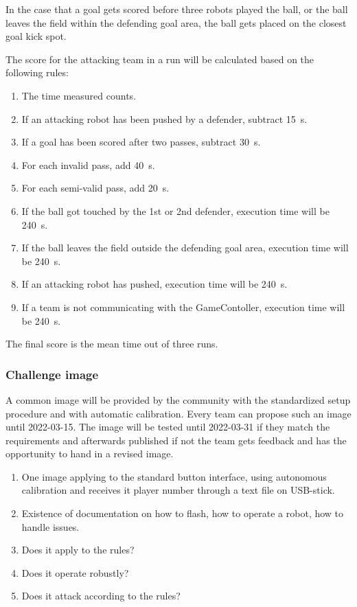         In the case that a goal gets scored before three robots played the ball, or the ball leaves the field within the defending goal area, the ball gets placed on the closest goal kick spot.

        The score for the attacking team in a run will be calculated based on the following rules:

        \begin{enumerate}
            \item The time measured counts.
            \item If an attacking robot has been pushed by a defender, subtract \qty{15}{\second}.
            \item If a goal has been scored after two passes, subtract \qty{30}{\second}.
            \item For each invalid pass, add \qty{40}{\second}.
            \item For each semi-valid pass, add \qty{20}{\second}.
            \item If the ball got touched by the 1st or 2nd defender, execution time will be \qty{240}{\second}.
            \item If the ball leaves the field outside the defending goal area, execution time will be \qty{240}{\second}.
            \item If an attacking robot has pushed, execution time will be \qty{240}{\second}.
            \item If a team is not communicating with the GameContoller, execution time will be \qty{240}{\second}.
        \end{enumerate}

        The final score is the mean time out of three runs.

    \subsubsection{Challenge image}
        \label{sec:Challenge_image}
        A common image will be provided by the community with the standardized setup procedure and with automatic calibration. Every team can propose such an image until 2022-03-15. The image will be tested until 2022-03-31 if they match the requirements and afterwards published if not the team gets feedback and has the opportunity to hand in a revised image.

        \begin{enumerate}
            \item One image applying to the standard button interface, using autonomous calibration and receives it player number through a text file on USB-stick.
            \item Existence of documentation on how to flash, how to operate a robot, how to handle issues.
            \item Does it apply to the rules?
            \item Does it operate robustly?
            \item Does it attack according to the rules?
        \end{enumerate}

